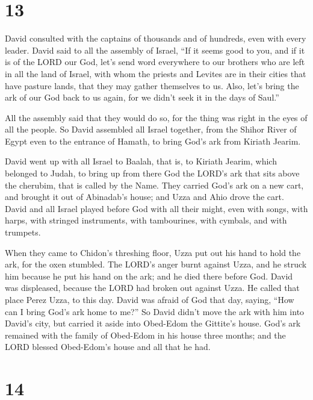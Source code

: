 \hypertarget{section-12}{%
\section{13}\label{section-12}}

 David consulted with the captains of thousands and of
hundreds, even with every leader.  David said to all the
assembly of Israel, ``If it seems good to you, and if it is of the LORD
our God, let's send word everywhere to our brothers who are left in all
the land of Israel, with whom the priests and Levites are in their
cities that have pasture lands, that they may gather themselves to us.
 Also, let's bring the ark of our God back to us again,
for we didn't seek it in the days of Saul.''

 All the assembly said that they would do so, for the
thing was right in the eyes of all the people.  So David
assembled all Israel together, from the Shihor River of Egypt even to
the entrance of Hamath, to bring God's ark from Kiriath Jearim.

 David went up with all Israel to Baalah, that is, to
Kiriath Jearim, which belonged to Judah, to bring up from there God the
LORD's ark that sits above the cherubim, that is called by the Name.
 They carried God's ark on a new cart, and brought it out
of Abinadab's house; and Uzza and Ahio drove the cart. 
David and all Israel played before God with all their might, even with
songs, with harps, with stringed instruments, with tambourines, with
cymbals, and with trumpets.

 When they came to Chidon's threshing floor, Uzza put out
his hand to hold the ark, for the oxen stumbled.  The
LORD's anger burnt against Uzza, and he struck him because he put his
hand on the ark; and he died there before God.  David was
displeased, because the LORD had broken out against Uzza. He called that
place Perez Uzza, to this day.  David was afraid of God
that day, saying, ``How can I bring God's ark home to me?''
 So David didn't move the ark with him into David's city,
but carried it aside into Obed-Edom the Gittite's house. 
God's ark remained with the family of Obed-Edom in his house three
months; and the LORD blessed Obed-Edom's house and all that he had.

\hypertarget{section-13}{%
\section{14}\label{section-13}}

